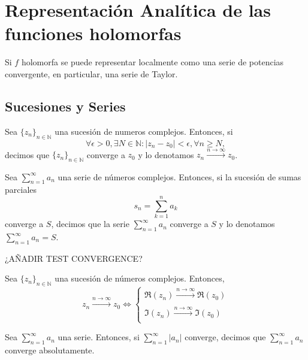 \chapter{Representación Analítica de las funciones holomorfas}

\begin{note}
  Si $f$ holomorfa se puede representar localmente como una serie de potencias convergente, en particular, una serie de Taylor.
\end{note}

\section{Sucesiones y Series}

\begin{defn}
  Sea $\{ z_{n} \}_{n \in \mathbb{N}}$ una sucesión de numeros complejos. Entonces, si
  \[
    \forall \epsilon > 0, \exists N \in \mathbb{N}: | z_{n} - z_{0} | < \epsilon, \forall n \geq N,
  \]
  decimos que $\{ z_{n} \}_{n \in \mathbb{N}}$ converge a $z_{0}$ y lo denotamos $z_{n} \xrightarrow[]{ n \rightarrow \infty } z_{0}$.
\end{defn}

\begin{defn}
  Sea $\sum_{n = 1}^{\infty} a_{n}$ una serie de números complejos. Entonces, si la sucesión de sumas parciales
  \[
    s_{n} = \sum_{k = 1}^{n} a_{k}
  \]
  converge a $S$, decimos que la serie $\sum_{n = 1}^{\infty} a_{n}$ converge a $S$ y lo denotamos $\sum_{n = 1}^{\infty} a_{n} = S$.
\end{defn}

¿AÑADIR TEST CONVERGENCE?

\begin{prop}
  Sea $\{ z_{n} \}_{n \in \mathbb{N}}$ una sucesión de números complejos. Entonces, 
  \[ 
    z_{n} \xrightarrow[]{ n \rightarrow \infty } z_{0} \Leftrightarrow 
    \begin{cases}
      \Re (z_{n}) \xrightarrow[]{ n \rightarrow \infty } \Re (z_{0}) \\
      \Im (z_{n}) \xrightarrow[]{ n \rightarrow \infty } \Im (z_{0})
    \end{cases} 
  \] 
\end{prop}

\begin{defn}
  Sea $\sum_{n = 1}^{\infty} a_{n}$ una serie. Entonces, si $\sum_{n = 1}^{\infty} |  a_{n} |$ converge, decimos que $ \sum_{n = 1}^{\infty} a_{n}$ converge absolutamente.
\end{defn}

